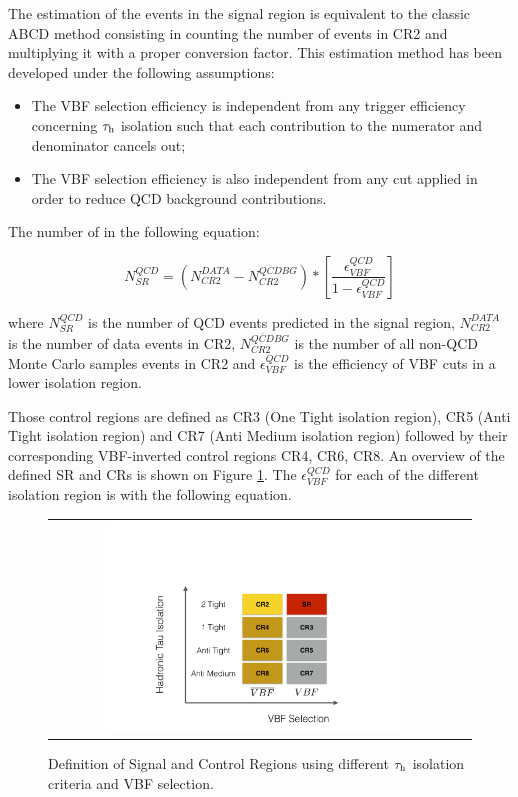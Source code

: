 The estimation of the events in the signal region is equivalent to the classic ABCD method consisting in counting the number of events in CR2 and multiplying it with a proper conversion factor. This estimation method has been developed under the following assumptions:

\begin{itemize}
	\item[1] The VBF selection efficiency is independent from any trigger efficiency concerning $\tau_{\text{h}}$ isolation such that each contribution to the numerator and denominator cancels out;
	\item[2] The VBF selection efficiency is also independent from any \met cut applied in order to reduce QCD background contributions. 
\end{itemize}

 The number of   in the following equation:

\begin{equation}
N^{QCD}_{SR} = \left( N^{DATA}_{CR2} - N^{\overline{QCD} BG}_{CR2} \right) * \left[ \frac{\epsilon^{QCD}_{VBF}}{1 - \epsilon^{QCD}_{VBF}} \right]
\label{eq:qcdbgpred}
\end{equation}

where $N^{QCD}_{SR}$ is the number of QCD events predicted in the signal region, $N^{DATA}_{CR2}$ is the number of data events in CR2, $N^{\overline{QCD} BG}_{CR2}$ is the number of all non-QCD Monte Carlo samples events in CR2 and $\epsilon^{QCD}_{VBF}$ is the efficiency of VBF cuts in a lower \hadtau isolation region. 

Those  control regions are defined as CR3 (One Tight isolation region), CR5  (Anti Tight isolation region) and CR7 (Anti Medium isolation region) followed by their corresponding VBF-inverted control regions CR4, CR6, CR8. An overview of the defined SR and CRs is shown on Figure \ref{fig:crs}. The $\epsilon^{QCD}_{VBF}$ for each of the different \hadtau isolation region is with the following equation.

\begin{figure}[tbh!]
	\centering
	\begin{tabular}{cc}
		\includegraphics[width=0.75\textwidth]{PLOTS/diTauHadLSotherPlots/controlregions.pdf}
	\end{tabular}
	\caption{Definition of Signal and Control Regions using different $\tau_{\text{h}}$ isolation criteria and VBF selection.}
	\label{fig:crs}
\end{figure}

